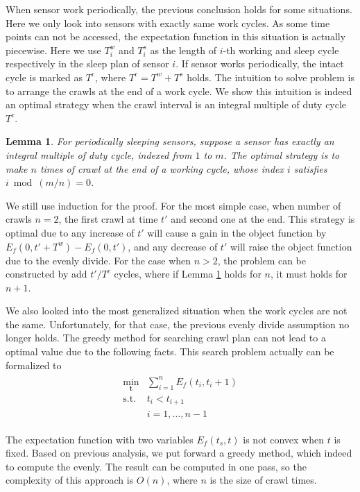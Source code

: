 \documentclass[conference]{IEEEtran}
\newtheorem{lemma}{Lemma}
\begin{document}
When sensor work periodically, the previous conclusion holds for some situations. 
Here we only look into sensors with exactly same work cycles.
As some time points can not be accessed, the expectation function in this situation is actually piecewise.
Here we use $T^{w}_{i}$ and $T^{s}_{i}$ as the length of $i$-th working and sleep cycle respectively in the sleep plan of sensor $i$.
If sensor works periodically, the intact cycle is marked as $T^{c}$, where $T^{c}=T^{w}+T^{s}$ holds.
The intuition to solve problem is to arrange the crawls at the end of a work cycle.
We show this intuition is indeed an optimal strategy when the crawl interval is an integral multiple of duty cycle $T^{c}$.
\begin{lemma}
\label{evenly_s}
For periodically sleeping sensors, suppose a sensor has exactly an integral multiple of duty cycle, indexed from $1$ to $m$.
The optimal strategy is to make $n$ times of crawl at the end of a working cycle, whose index $i$ satisfies $i \bmod (m/n)=0$.
\end{lemma}
\begin{IEEEproof}
We still use induction for the proof.
For the most simple case, when number of crawls $n=2$, the first crawl at time $t'$ and second one at the end. 
This strategy is optimal due to any increase of $t'$ will cause a gain in the object function by $E_f(0,t'+T^{w})-E_f(0,t')$, and any decrease of $t'$ will raise the object function due to the evenly divide.
For the case when $n>2$, the problem can be constructed by add $t'/T^{c}$ cycles, where if Lemma \ref{evenly_s} holds for $n$, it must holds for $n+1$.
\end{IEEEproof}

We also looked into the most generalized situation when the work cycles are not the same.
Unfortunately, for that case, the previous evenly divide assumption no longer holds.
The greedy method for searching crawl plan can not lead to a optimal value due to the following facts. 
This search problem actually can be formalized to 
\begin{eqnarray}
\begin{array}{ll}
\min_{\textbf{t}}& \sum_{i=1}^{n} E_f(t_i,t_i+1)\\
\text{s.t.}
& t_i < t_{i+1}\\
& i=1,\ldots,n-1
\end{array}\label{greedy_obj}
\end{eqnarray}

The expectation function with two variables $E_f(t_s,t)$ is not convex when $t$ is fixed.
Based on previous analysis, we put forward a greedy method, which indeed to compute the evenly. 
The result can be computed in one pass, so the complexity of this approach is $O(n)$, where $n$ is the size of crawl times.
\end{document}
